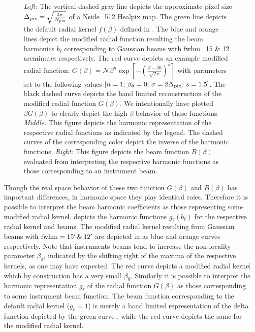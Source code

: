\begin{figure}[!t] 
\centering
{}\\
\caption{\textit{Left:} The vertical dashed gray line depicts the approximate pixel size $\Delta_{\rm pix} = \sqrt{\frac{4 \pi}{N_{\rm pix}}}$ of a Nside=512 Healpix map. The green line depicts the default radial kernel $f(\beta)$ defined in . The blue and orange lines depict the modified radial function resulting the beam harmonics $b_{\ell}$ corresponding to Gaussian beams with fwhm=15 \& 12 arcminutes respectively. The red curve depicts an example modified radial function: $G(\beta)=\mathcal{N} \beta^n \exp{\left[ -\left( \frac{\beta-\beta0}{\sqrt{2} \sigma} \right)^s \right]}$ with parameters set to the following values $[n=1;\, \beta_0=0 ;\, \sigma = 2\Delta_{\rm pix} ;\, s=1.5]$. The black dashed curve depicts the band limited reconstruction of the modified radial function $G(\beta)$. We intentionally have plotted $\beta G(\beta)$ to clearly depict the high $\beta$ behavior of these functions. \textit{Middle: } This figure depicts the harmonic representation of the respective radial functions as indicated by the legend. The dashed curves of the corresponding color depict the inverse of the harmonic functions. \textit{Right:} This figure depicts the beam function $B(\beta)$ evaluated from interpreting the respective harmonic functions as those corresponding to an instrument beam.}
\label{fig:example_gbeta}
\end{figure}
%

Though the real space behavior of these two function $G(\beta)$ and $B(\beta)$ has important differences, in harmonic space they play identical roles. Therefore it is possible to interpret the beam harmonic coefficients as those representing some modified radial kernel.  depicts the harmonic functions $g_{\ell} (b_{\ell})$ for the respective radial kernel and beams.  The modified radial kernel resulting from Gaussian beams with ${\rm fwhm} =15' \,\&\, 12'$ are depicted in  as blue and orange curves respectively. Note that instruments  beams tend to increase the non-locality parameter $\beta_0$, indicated by the shifting right of the maxima of the respective kernels, as one may have expected. The red curve depicts a modified radial kernel which by construction has a very small $\beta_0$.  Similarly it is possible to interpret the harmonic representation $g_{\ell}$ of the radial function $G(\beta)$ as those corresponding to some instrument beam function. The beam function corresponding to the default radial kernel ($g_{\ell}=1$) is merely a band limited representation of the delta function depicted by the green curve , while the red curve depicts the same for the modified radial kernel.

